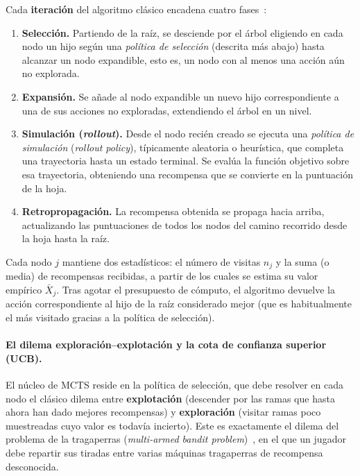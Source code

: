 Cada \textbf{iteración} del algoritmo clásico encadena cuatro fases~\cite{browne2012survey}:
\begin{enumerate}
    \item \textbf{Selección.} Partiendo de la raíz, se desciende por el árbol eligiendo en cada nodo un hijo según una \emph{política de selección} (descrita más abajo) hasta alcanzar un nodo expandible, esto es, un nodo con al menos una acción aún no explorada.
    \item \textbf{Expansión.} Se añade al nodo expandible un nuevo hijo correspondiente a una de sus acciones no exploradas, extendiendo el árbol en un nivel.
    \item \textbf{Simulación (\emph{rollout}).} Desde el nodo recién creado se ejecuta una \emph{política de simulación} (\emph{rollout policy}), típicamente aleatoria o heurística, que completa una trayectoria hasta un estado terminal. Se evalúa la función objetivo sobre esa trayectoria, obteniendo una recompensa que se convierte en la puntuación de la hoja.
    \item \textbf{Retropropagación.} La recompensa obtenida se propaga hacia arriba, actualizando las puntuaciones de todos los nodos del camino recorrido desde la hoja hasta la raíz.
\end{enumerate}

Cada nodo $j$ mantiene dos estadísticos: el número de visitas $n_j$ y la suma (o media) de recompensas recibidas, a partir de los cuales se estima su valor empírico $\bar{X}_j$. Tras agotar el presupuesto de cómputo, el algoritmo devuelve la acción correspondiente al hijo de la raíz considerado mejor (que es habitualmente el más visitado gracias a la política de selección).

\paragraph{El dilema exploración--explotación y la cota de confianza superior (UCB).}
El núcleo de MCTS reside en la política de selección, que debe resolver en cada nodo el clásico dilema entre \textbf{explotación} (descender por las ramas que hasta ahora han dado mejores recompensas) y \textbf{exploración} (visitar ramas poco muestreadas cuyo valor es todavía incierto). Este es exactamente el dilema del problema de la tragaperras (\emph{multi-armed bandit problem})~\cite{kocsis2006bandit}, en el que un jugador debe repartir sus tiradas entre varias máquinas tragaperras de recompensa desconocida.

